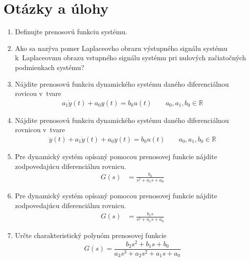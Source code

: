 \documentclass[a4paper, 10pt, ]{article}
\begin{document}
\section{Otázky a úlohy}


\begin{enumerate}[leftmargin=0pt, labelsep=3mm, itemsep=0pt]

    \item Definujte prenosovú funkciu systému.

    \item Ako sa nazýva pomer Laplaceovho obrazu výstupného signálu systému k~Laplaceovmu obrazu vstupného signálu systému pri nulových začiatočných podmienkach systému?





    \item Nájdite prenosovú funkciu dynamického systému daného diferenciálnou rovicou v~tvare
    \begin{align*}
        a_1 \dot y(t) + a_0 y(t) = b_0 u(t) \qquad a_0, a_1, b_0\in\mathbb R
    \end{align*}

    \item Nájdite prenosovú funkciu dynamického systému daného diferenciálnou rovnicou v~tvare
    \begin{align*}
        \ddot y(t) + a_1 \dot y(t) + a_0 y(t) = b_0 u(t) \qquad a_0, a_1, b_0\in\mathbb R
    \end{align*}



    \item Pre dynamický systém opísaný pomocou prenosovej funkcie nájdite zodpovedajúcu diferenciálnu rovnicu.
    \begin{align*}
        G(s) &= \frac{b_0}{s^2 + a_1 s + a_0}
    \end{align*}


    \item Pre dynamický systém opísaný pomocou prenosovej funkcie nájdite zodpovedajúcu diferenciálnu rovnicu.
    \begin{align*}
        G(s) &= \frac{b_1 s}{s^2 + a_1 s + a_0}
    \end{align*}

    \item Určte charakteristický polynóm prenosovej funkcie
    \begin{equation*}
        G(s) = \frac{b_2 s^2 + b_1 s + b_0}{a_3 s^3 + a_2 s^2 + a_1 s + a_0}
    \end{equation*}



\end{enumerate}
\end{document}
